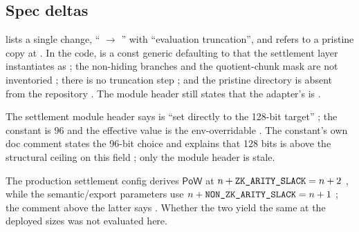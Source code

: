\subsection{Spec deltas}
\label{subsec:ps-deltas}

\begin{specdelta}
\label{delta:ps-patches}
 lists a single change, `` $\to$
'' with ``evaluation truncation'', and refers to a pristine copy at
. In the code,  is a const
generic defaulting to  that the settlement layer instantiates as
  ; the
non-hiding branches and the quotient-chunk mask are not inventoried
; there is no truncation step
; and the pristine directory is absent from the
repository . The module header still states that the adapter's
 is  .
\end{specdelta}

\begin{specdelta}
\label{delta:ps-128}
The settlement module header says  is ``set directly to
the 128-bit target'' ; the constant is $96$
and the effective value is the env-overridable 
 . The constant's own doc comment states the
96-bit choice and explains that 128 bits is above the structural ceiling on this
field ; only the module header is stale.
\end{specdelta}

\begin{specdelta}
\label{delta:ps-slack}
The production settlement config derives $\mathsf{PoW}$ at
$n+\texttt{ZK\_ARITY\_SLACK} = n+2$ , while the semantic/export
parameters use $n+\texttt{NON\_ZK\_ARITY\_SLACK} = n+1$
; the comment above the latter says
 . Whether the two
yield the same  at the deployed sizes was not evaluated here.
\end{specdelta}

